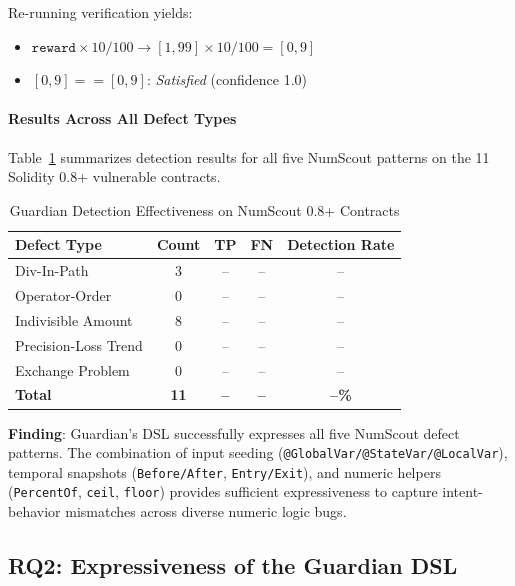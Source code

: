 \documentclass[pdflatex,sn-basic]{sn-jnl}%
\theoremstyle{thmstyleone}%
\theoremstyle{thmstyletwo}%
\theoremstyle{thmstylethree}%
\begin{document}
Re-running verification yields:
\begin{itemize}
    \item $\texttt{reward} \times 10 / 100 \rightarrow [1, 99] \times 10 / 100 = [0, 9]$
    \item $[0, 9] == [0, 9]$: \textit{Satisfied} (confidence 1.0)
\end{itemize}

\paragraph{Results Across All Defect Types}
Table~\ref{tab:rq1-results} summarizes detection results for all five NumScout patterns on the 11 Solidity 0.8+ vulnerable contracts.

\begin{table}[h]
\centering
\caption{Guardian Detection Effectiveness on NumScout 0.8+ Contracts}
\label{tab:rq1-results}
\begin{tabular}{lcccc}
\hline
\textbf{Defect Type} & \textbf{Count} & \textbf{TP} & \textbf{FN} & \textbf{Detection Rate} \\
\hline
Div-In-Path & 3 & -- & -- & -- \\
Operator-Order & 0 & -- & -- & -- \\
Indivisible Amount & 8 & -- & -- & -- \\
Precision-Loss Trend & 0 & -- & -- & -- \\
Exchange Problem & 0 & -- & -- & -- \\
\hline
\textbf{Total} & \textbf{11} & \textbf{--} & \textbf{--} & \textbf{--\%} \\
\hline
\end{tabular}
\end{table}


\textbf{Finding}: Guardian's DSL successfully expresses all five NumScout defect patterns. The combination of input seeding (\texttt{@GlobalVar/@StateVar/@LocalVar}), temporal snapshots (\texttt{Before/After}, \texttt{Entry/Exit}), and numeric helpers (\texttt{PercentOf}, \texttt{ceil}, \texttt{floor}) provides sufficient expressiveness to capture intent-behavior mismatches across diverse numeric logic bugs.


\subsection{RQ2: Expressiveness of the Guardian DSL}
\label{sec:rq2}
\end{document}
